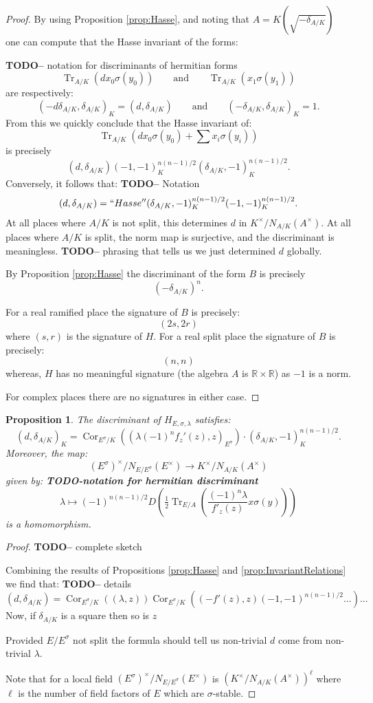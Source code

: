\documentclass{article}
\theoremstyle{plain}
\newtheorem{proposition}[theorem]{Proposition}
\theoremstyle{definition}
\numberwithin{equation}{section}
\DeclareMathOperator{\Tr}{Tr}
\DeclareMathOperator{\Cor}{Cor}
\newcommand{\RR}{\mathbb{R}}
\newcommand{\TODO}[1]{\textbf{TODO-#1}}
\begin{document}
\begin{proof}
By using Proposition \ref{prop:Hasse}, and noting that $A = K(\sqrt{-\delta_{A/K}})$ one can compute that the Hasse invariant of the forms:

\TODO - notation for discriminants of hermitian forms
\[\Tr_{A/K}(dx_0\sigma(y_0)) \qquad \text{and} \qquad \Tr_{A/K}(x_1\sigma(y_1)) \]
are respectively:
\[ (-d \delta_{A/K}, \delta_{A/K})_K = (d,\delta_{A/K}) \qquad \text{and}\qquad ( -\delta_{A/K}, \delta_{A/K})_K = 1. \]
From this we quickly conclude that the Hasse invariant of:
\[ \Tr_{A/K}\left(dx_0\sigma(y_0) + \sum x_i\sigma(y_i)\right) \]
is precisely
\[ (d,\delta_{A/K})(-1,-1)_K^{n(n-1)/2}(\delta_{A/K},-1)_K^{n(n-1)/2}.\]
Conversely, it follows that:
\TODO - Notation
\[ (d,\delta_{A/K}) = ``Hasse''  (\delta_{A/K},-1)_K^{n(n-1)/2}(-1,-1)_K^{n(n-1)/2}. \]
At all places where $A/K$ is not split, this determines $d$ in $K^\times/N_{A/K}(A^\times)$.
At all places where $A/K$ is split, the norm map is surjective, and the discriminant is meaningless.
\TODO - phrasing that tells us we just determined $d$ globally.


By Proposition \ref{prop:Hasse} the discriminant of the form $B$ is precisely
\[ (-\delta_{A/K})^n. \]

For a real ramified place the signature of $B$ is precisely:
\[ (2s,2r) \]
where $(s,r)$ is the signature of $H$.
For a real split place the signature of $B$ is precisely:
\[ (n,n) \]
whereas, $H$ has no meaningful signature (the algebra $A$ is $\RR\times \RR$) as $-1$ is a norm.

For complex places there are no signatures in either case.
\end{proof}


\begin{proposition}\label{prop:discrimmap}
The discriminant of $H_{E,\sigma,\lambda}$ satisfies:
\[  (d,\delta_{A/K})_K =  \Cor_{E^\sigma/K}((\lambda (-1)^n f_z'(z), z)_{E^\sigma}) \cdot (\delta_{A/K},-1)_K^{n(n-1)/2}. \]
Moreover, the map:
\[ (E^\sigma)^\times/N_{E/E^\sigma}(E^\times) \rightarrow K^\times/N_{A/K}(A^\times) \]
given by:
\TODO{notation for hermitian discriminant}
\[ \lambda \mapsto (-1)^{n(n-1)/2} D\left( \tfrac{1}{2}\Tr_{E/A}\left( \frac{(-1)^n\lambda}{f'_z(z)} x\sigma(y) \right)\right) \]
is a homomorphism.
\end{proposition}
\begin{proof}
\TODO - complete sketch

Combining the results of Propositions \ref{prop:Hasse} and \ref{prop:InvariantRelations} we find that:
\TODO - details
\[ (d,\delta_{A/K}) =  \Cor_{E^\sigma/K}((\lambda,z)) \Cor_{E^\sigma/K}((-f'(z),z) (-1,-1)^{n(n-1)/2}...) ... \]
Now, if $\delta_{A/K}$ is a square then so is $z$

Provided $E/E^\sigma$ not split the formula should tell us non-trivial $d$ come from non-trivial $\lambda$.

Note that for a local field $(E^\sigma)^\times/N_{E/E^\sigma}(E^\times)$ is $( K^\times/N_{A/K}(A^\times))^\ell$ where $\ell$ is the number of field factors of $E$ which are $\sigma$-stable.
\end{proof}
\end{document}
